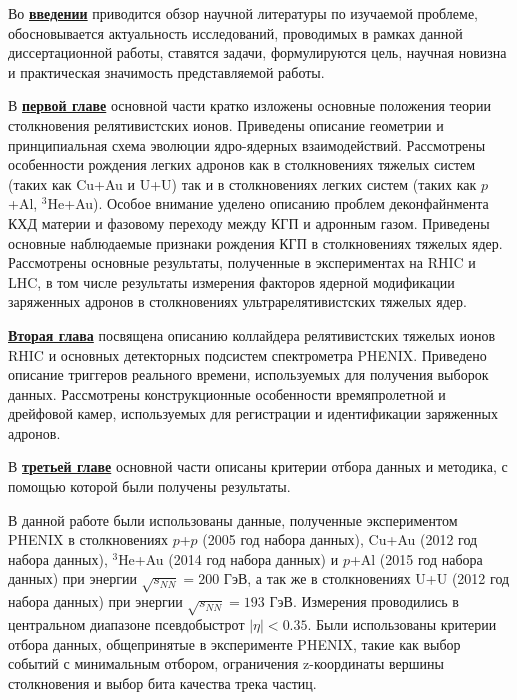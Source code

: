Во \underline{\textbf{введении}} приводится обзор научной литературы по изучаемой проблеме, обосновывается актуальность исследований, проводимых в рамках данной диссертационной работы, ставятся задачи, формулируются цель, научная новизна и практическая значимость представляемой работы.

В \underline{\textbf{первой главе}} основной части кратко изложены основные положения теории столкновения релятивистских ионов.  Приведены описание геометрии и принципиальная схема эволюции ядро-ядерных взаимодействий. Рассмотрены особенности рождения легких адронов как в столкновениях тяжелых систем (таких как Cu+Au и U+U) так и в столкновениях легких систем (таких как $p$+Al, $^{3}$He+Au). Особое внимание уделено описанию проблем деконфайнмента КХД материи и фазовому переходу между КГП и адронным газом. Приведены основные наблюдаемые признаки рождения КГП в столкновениях тяжелых ядер. Рассмотрены основные результаты, полученные в экспериментах на RHIC и LHC, в том числе результаты измерения факторов ядерной модификации заряженных адронов в столкновениях ультрарелятивистских тяжелых ядер.

\underline{\textbf{Вторая глава}} посвящена описанию коллайдера релятивистских тяжелых ионов RHIC и основных детекторных подсистем спектрометра PHENIX. Приведено описание триггеров реального времени, используемых для получения выборок данных. Рассмотрены конструкционные особенности времяпролетной и дрейфовой камер, используемых для регистрации и идентификации заряженных адронов.

В \underline{\textbf{третьей главе}} основной части описаны критерии отбора данных и методика, с помощью которой были получены результаты.

В данной работе были использованы данные, полученные экспериментом PHENIX в столкновениях $p$+$p$ (2005 год набора данных), Cu+Au (2012 год набора данных), $^{3}$He+Au (2014 год набора данных) и $p$+Al (2015 год набора данных) при энергии $\sqrt{s_{NN}}=200$ ГэВ, а так же в столкновениях U+U (2012 год набора данных) при энергии $\sqrt{s_{NN}}=193$ ГэВ. Измерения проводились в центральном диапазоне псевдобыстрот $|\eta|<0.35$.
Были использованы критерии отбора данных, общепринятые в эксперименте PHENIX, такие как выбор событий с минимальным отбором, ограничения z-координаты вершины столкновения и выбор бита качества трека частиц. 

